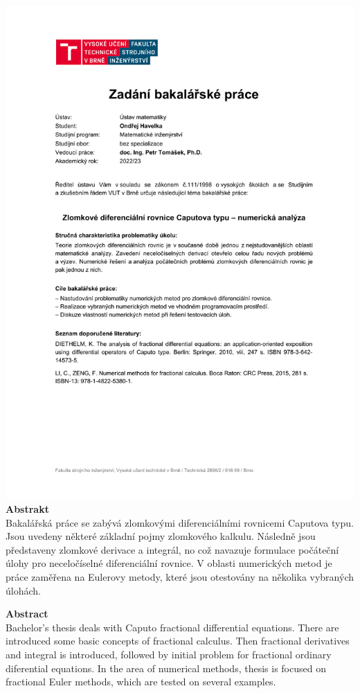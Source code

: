\documentclass[a4paper,12pt,twoside]{article}
\theoremstyle{definition}
\theoremstyle{remark}
\numberwithin{equation}{section}
\numberwithin{table}{section}
\numberwithin{figure}{section}
\begin{document}
\newpage
\thispagestyle{empty}
\
\newpage
\includegraphics[width = \textwidth]{zav_prace__6a47feaede907e7e33a4b03780487b63.pdf}
\newpage
\thispagestyle{empty}
\noindent
{\bf Abstrakt}\\[1mm]
Bakalářská práce se zabývá zlomkovými diferenciálními rovnicemi Caputova typu. Jsou uvedeny některé základní pojmy zlomkového kalkulu. Následně jsou představeny zlomkové derivace a integrál, no což navazuje formulace počáteční úlohy pro neceločíselné diferenciální rovnice. V oblasti numerických metod je práce zaměřena na Eulerovy metody, které jsou otestovány na několika vybraných úlohách.

\vspace{1cm}\noindent
{\bf Abstract}\\[1mm]
Bachelor's thesis deals with Caputo fractional differential equations. There are introduced some basic concepts of fractional calculus. Then fractional derivatives and integral is introduced, followed by initial problem for fractional ordinary diferential equations. In the area of numerical methods, thesis is focused on fractional Euler methods, which are tested on several examples.
\end{document}

